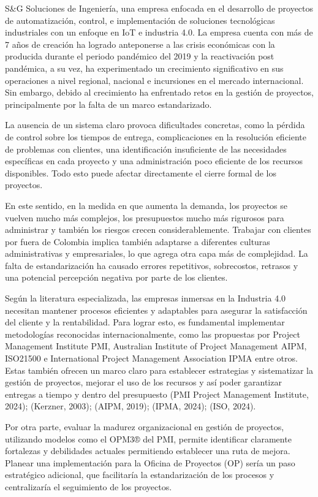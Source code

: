 S\&G Soluciones de Ingeniería, una empresa enfocada en el desarrollo de proyectos de automatización, control, e implementación de soluciones tecnológicas industriales con un enfoque en IoT e industria 4.0. La empresa cuenta con más de 7 años de creación ha logrado anteponerse a las crisis económicas con la producida durante el periodo pandémico del 2019 y la reactivación post pandémica, a su vez, ha experimentado un crecimiento significativo en sus operaciones a nivel regional, nacional e incursiones en el mercado internacional. Sin embargo, debido al crecimiento ha enfrentado retos en la gestión de proyectos, principalmente por la falta de un marco estandarizado.

La ausencia de un sistema claro provoca dificultades concretas, como la pérdida de control sobre los tiempos de entrega, complicaciones en la resolución eficiente de problemas con clientes, una identificación insuficiente de las necesidades específicas en cada proyecto y una administración poco eficiente de los recursos disponibles. Todo esto puede afectar directamente el cierre formal de los proyectos.

En este sentido, en la medida en que aumenta la demanda, los proyectos se vuelven mucho más complejos, los presupuestos mucho más rigurosos para administrar y también los riesgos crecen considerablemente. Trabajar con clientes por fuera de Colombia implica también adaptarse a diferentes culturas administrativas y empresariales, lo que agrega otra capa más de complejidad. La falta de estandarización ha causado errores repetitivos, sobrecostos, retrasos y una potencial percepción negativa por parte de los clientes.

Según la literatura especializada, las empresas inmersas en la Industria 4.0 necesitan mantener procesos eficientes y adaptables para asegurar la satisfacción del cliente y la rentabilidad. Para lograr esto, es fundamental implementar metodologías reconocidas internacionalmente, como las propuestas por Project Management Institute PMI, Australian Institute of Project Management AIPM, ISO21500 e International Project Management Association IPMA entre otros. Estas también ofrecen un marco claro para establecer estrategias y sistematizar la gestión de proyectos, mejorar el uso de los recursos y así poder garantizar entregas a tiempo y dentro del presupuesto (PMI Project Management Institute, 2024); (Kerzner, 2003); (AIPM, 2019); (IPMA, 2024); (ISO, 2024).

Por otra parte, evaluar la madurez organizacional en gestión de proyectos, utilizando modelos como el OPM3® del PMI, permite identificar claramente fortalezas y debilidades actuales permitiendo establecer una ruta de mejora. Planear una implementación para la Oficina de Proyectos (OP) sería un paso estratégico adicional, que facilitaría la estandarización de los procesos y centralizaría el seguimiento de los proyectos.


